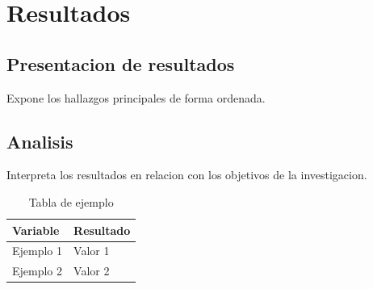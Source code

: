 \chapter{Resultados}

\section{Presentacion de resultados}
Expone los hallazgos principales de forma ordenada.

\section{Analisis}
Interpreta los resultados en relacion con los objetivos de la investigacion.

\begin{table}[H]
  \centering
  \caption{Tabla de ejemplo}
  \begin{tabular}{ll}
    \toprule
    Variable & Resultado \\
    \midrule
    Ejemplo 1 & Valor 1 \\
    Ejemplo 2 & Valor 2 \\
    \bottomrule
  \end{tabular}
\end{table}
